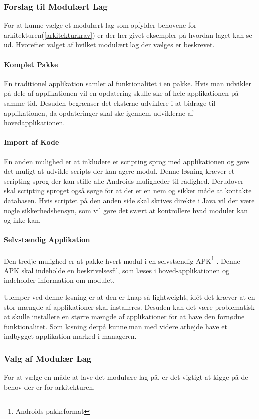 \subsubsection{Forslag til Modulært Lag}
For at kunne vælge et modulært lag som opfylder behovene for arkitekturen(\cref{arkitekturkrav}) er der her givet eksempler på hvordan laget kan se ud.
Hvorefter valget af hvilket modulært lag der vælges er beskrevet.

\paragraph{Komplet Pakke}
En traditionel applikation samler al funktionalitet i en pakke.
Hvis man udvikler på dele af applikationen vil en opdatering skulle ske af hele applikationen på samme tid.
Desuden begrænser det eksterne udviklere i at bidrage til applikationen, da opdateringer skal ske igennem udviklerne af hovedapplikationen.

\paragraph{Import af Kode}
En anden mulighed er at inkludere et scripting sprog med applikationen og gøre det muligt at udvikle scripts der kan agere modul.
Denne løsning kræver et scripting sprog der kan  stille alle Androids muligheder til rådighed.
Derudover skal scripting sproget også sørge for at der er en nem og sikker måde at kontakte databasen.
Hvis scriptet på den anden side skal skrives direkte i Java vil der være nogle sikkerhedshensyn, som vil gøre det svært at kontrollere hvad moduler kan og ikke kan.

\paragraph{Selvstændig Applikation}
Den tredje mulighed er at pakke hvert modul i en selvstændig APK\footnote{Androids pakkeformat} \citep{misc:apk}.
Denne APK skal indeholde en beskrivelsesfil, som læses i hoved-applikationen og indeholder information om modulet.

Ulemper ved denne løsning er at den er knap så lightweight, idét det kræver at en stor mængde af applikationer skal installeres.
Desuden kan det være problematisk at skulle installere en større mængde af applikationer for at have den fornødne funktionalitet.
Som løsning derpå kunne man med videre arbejde have et indbygget applikation marked i manageren.

\subsubsection{Valg af Modulær Lag}
For at vælge en måde at lave det modulære lag på, er det vigtigt at kigge på de behov der er for arkitekturen.

